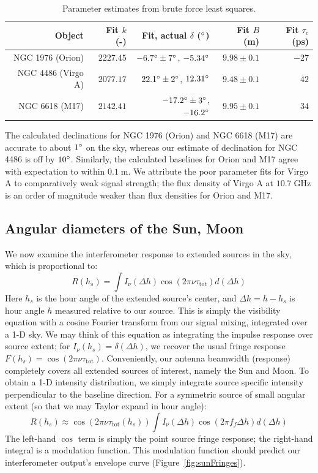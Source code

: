 \documentclass[10pt]{article}
\newcommand {\mt}{\mathrm}
\newcommand {\unit}[1]{\; \mt{#1}}
\begin{document}
\begin{table}[!ht]
\centering
\caption{Parameter estimates from brute force least squares.}
\label{tab:dec}
\begin{tabular}{@{}rrrrr@{}}
    \toprule
    Object & Fit $k$ (-)
        & Fit, actual $\delta$ ($\degree$)
        & Fit $B$ (m) & Fit $\tau_c$ (ps) \\
    \midrule
    NGC 1976 (Orion) & $2227.45$
        & $-6.7\degree \pm 7\degree$, $-5.34\degree$
        & $9.98 \pm 0.1$ & $-27$ \\
    NGC 4486 (Virgo A) & $2077.17$
        & $22.1\degree \pm 2\degree$, $12.31\degree$
        & $9.48 \pm 0.1$ & $42$ \\
    NGC 6618 (M17) & $2142.41$
        & $-17.2\degree \pm 3\degree$, $-16.2\degree$
        & $9.95 \pm 0.1$ & $34$ \\
    \bottomrule
\end{tabular}
\end{table}

The calculated declinations for NGC 1976 (Orion) and NGC 6618 (M17) are accurate to about $1\degree$ on the sky, whereas our estimate of declination for NGC 4486 is off by $10\degree$.  Similarly, the calculated baselines for Orion and M17 agree with expectation to within $0.1 \unit{m}$.  We attribute the poor parameter fits for Virgo A to comparatively weak signal strength; the flux density of Virgo A at $10.7 \unit{GHz}$ is an order of magnitude weaker than flux densities for Orion and M17.

\subsection{Angular diameters of the Sun, Moon}

We now examine the interferometer response to extended sources in the sky, which is proportional to:
$$
    R(h_s) = \int I_\nu (\Delta h) \cos(2\pi\nu \tau_{\mathrm{tot}}) d(\Delta h)
$$
Here $h_s$ is the hour angle of the extended source's center, and $\Delta h = h - h_s$ is hour angle $h$ measured relative to our source.  This is simply the visibility equation with a cosine Fourier transform from our signal mixing, integrated over a 1-D sky.  We may think of this equation as integrating the impulse response over source extent; for $I_\nu(h_s) = \delta(\Delta h)$, we recover the usual fringe response $F(h_s) = \cos(2\pi\nu \tau_{\mathrm{tot}})$.  Conveniently, our antenna beamwidth (response) completely covers all extended sources of interest, namely the Sun and Moon.  To obtain a 1-D intensity distribution, we simply integrate source specific intensity perpendicular to the baseline direction.  For a symmetric source of small angular extent (so that we may Taylor expand in hour angle):
$$
    R(h_s) \approx \cos(2\pi\nu \tau_{\mathrm{tot}}(h_s)) \int I_\nu (\Delta h) \cos(2\pi f_f \Delta h) d(\Delta h)
$$
The left-hand $\cos$ term is simply the point source fringe response; the right-hand integral is a modulation function.  This modulation function should predict our interferometer output's envelope curve (Figure~\ref{fig:sunFringes}).
\end{document}

